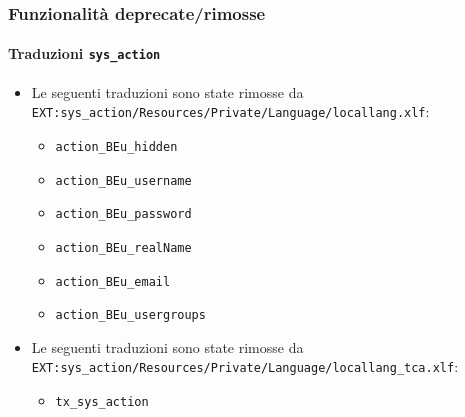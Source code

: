 \begin{frame}[fragile]
	\frametitle{Funzionalità deprecate/rimosse}
	\framesubtitle{Traduzioni \texttt{sys\_action}}

	\begin{itemize}
		\item Le seguenti traduzioni sono state rimosse da
			\smaller\texttt{EXT:sys\_action/Resources/Private/Language/locallang.xlf}:\normalsize

		\begin{itemize}
			\item \texttt{action\_BEu\_hidden}
			\item \texttt{action\_BEu\_username}
			\item \texttt{action\_BEu\_password}
			\item \texttt{action\_BEu\_realName}
			\item \texttt{action\_BEu\_email}
			\item \texttt{action\_BEu\_usergroups}
		\end{itemize}

		\item Le seguenti traduzioni sono state rimosse da
			\smaller\texttt{EXT:sys\_action/Resources/Private/Language/locallang\_tca.xlf}:\normalsize

		\begin{itemize}
			\item \texttt{tx\_sys\_action}
		\end{itemize}

	\end{itemize}

\end{frame}



